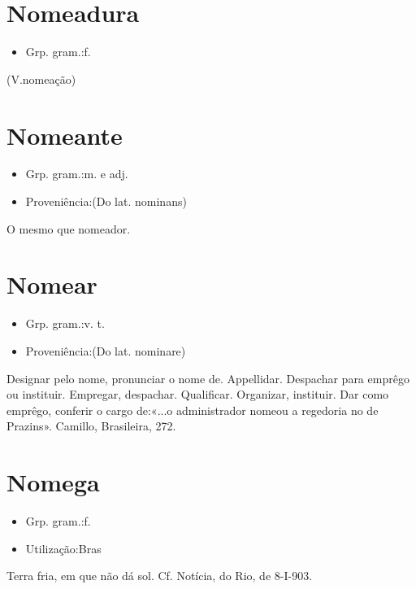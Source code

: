 \section{Nomeadura}
\begin{itemize}
\item {Grp. gram.:f.}
\end{itemize}
(V.nomeação)
\section{Nomeante}
\begin{itemize}
\item {Grp. gram.:m.  e  adj.}
\end{itemize}
\begin{itemize}
\item {Proveniência:(Do lat. \textunderscore nominans\textunderscore )}
\end{itemize}
O mesmo que \textunderscore nomeador\textunderscore .
\section{Nomear}
\begin{itemize}
\item {Grp. gram.:v. t.}
\end{itemize}
\begin{itemize}
\item {Proveniência:(Do lat. \textunderscore nominare\textunderscore )}
\end{itemize}
Designar pelo nome, pronunciar o nome de.
Appellidar.
Despachar para emprêgo ou instituir.
Empregar, despachar.
Qualificar.
Organizar, instituir.
Dar como emprêgo, conferir o cargo de:«\textunderscore ...o administrador nomeou a regedoria no de Prazins\textunderscore ». Camillo, \textunderscore Brasileira\textunderscore , 272.
\section{Nomega}
\begin{itemize}
\item {Grp. gram.:f.}
\end{itemize}
\begin{itemize}
\item {Utilização:Bras}
\end{itemize}
Terra fria, em que não dá sol. Cf. \textunderscore Notícia\textunderscore , do Rio, de 8-I-903.
